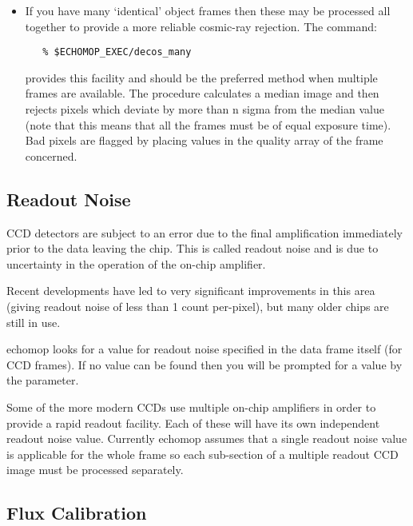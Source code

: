 \begin{itemize}

\item If you have many `identical' object frames then these may be
      processed all together to provide a more reliable cosmic-ray
      rejection. The command:


\begin{verbatim}
   % $ECHOMOP_EXEC/decos_many
\end{verbatim}

provides this facility and should be the preferred method when multiple
frames are available. The procedure calculates a median image and then
rejects pixels which deviate by more than n sigma from the median value
(note that this means that all the frames must be of equal exposure
time). Bad pixels are flagged by placing values in the quality array of
the frame concerned.

\end{itemize}


\subsection{Readout Noise}

CCD detectors are subject to an error due to the final amplification
immediately prior to the data leaving the chip. This is called readout
noise and is due to uncertainty in the operation of the on-chip
amplifier.

Recent developments have led to very significant improvements in this
area (giving readout noise of less than 1 count per-pixel),  but many
older chips are still in use.

{\sc echomop} looks for a value for readout noise specified in the data
frame itself (for CCD frames).  If no value can be found then you
will be prompted for a value by the
 parameter.

Some of the more modern CCDs use multiple on-chip amplifiers in order
to provide a rapid readout facility.  Each of these will have its own
independent readout noise value.  Currently {\sc echomop} assumes that a single
readout noise value is applicable for the whole frame so each sub-section
of a multiple readout CCD image must be processed separately.


\subsection{Flux Calibration}

